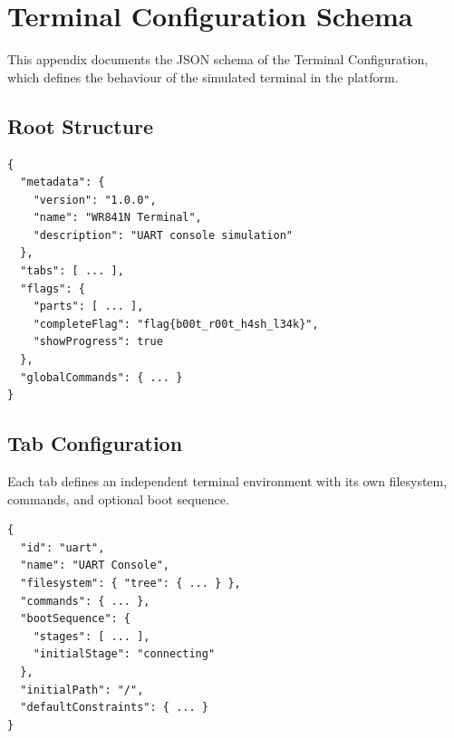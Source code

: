 \chapter{Terminal Configuration Schema}\label{app:terminal-schema}

This appendix documents the JSON schema of the Terminal Configuration, which defines the behaviour of the simulated terminal in the \pcbctf{} platform.

\section{Root Structure}\label{sec:app-tc-root}

\noindent\begin{minipage}{\linewidth}
\begin{lstlisting}[language={}, caption={Top-level TerminalConfig schema.}]
{
  "metadata": {
    "version": "1.0.0",
    "name": "WR841N Terminal",
    "description": "UART console simulation"
  },
  "tabs": [ ... ],
  "flags": {
    "parts": [ ... ],
    "completeFlag": "flag{b00t_r00t_h4sh_l34k}",
    "showProgress": true
  },
  "globalCommands": { ... }
}
\end{lstlisting}
\end{minipage}

\section{Tab Configuration}\label{sec:app-tc-tab}

Each tab defines an independent terminal environment with its own filesystem, commands, and optional boot sequence.

\noindent\begin{minipage}{\linewidth}
\begin{lstlisting}[language={}, caption={TabConfig structure.}]
{
  "id": "uart",
  "name": "UART Console",
  "filesystem": { "tree": { ... } },
  "commands": { ... },
  "bootSequence": {
    "stages": [ ... ],
    "initialStage": "connecting"
  },
  "initialPath": "/",
  "defaultConstraints": { ... }
}
\end{lstlisting}
\end{minipage}

